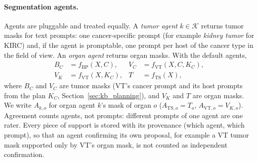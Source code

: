 \documentclass[fleqn,10pt]{olplainarticle}
\begin{document}
\paragraph{Segmentation agents.}
Agents are pluggable and treated equally. A \emph{tumor agent} $k\in\mathcal{K}$ returns tumor masks for text prompts:
one cancer-specific prompt (for example \emph{kidney tumor} for KIRC) and, if the agent is promptable, one prompt per host
of the cancer type in the field of view. An \emph{organ agent} returns organ masks. With the default agents,
\begin{equation}
\label{eq:agents}
\begin{aligned}
B_C&=f_{\mathrm{BP}}(X,C), & V_C&=f_{\mathrm{VT}}(X,C,K_C),\\
V_K&=f_{\mathrm{VT}}(X,K_C), & T&=f_{\mathrm{TS}}(X),
\end{aligned}
\end{equation}
where $B_C$ and $V_C$ are tumor masks (VT's cancer prompt and its host prompts from the plan $K_C$,
Section~\ref{sec:kb_planning}), and $V_K$ and $T$ are organ masks. We write $A_{k,o}$ for organ agent $k$'s mask of
organ $o$ ($A_{\mathrm{TS},o}=T_o$, $A_{\mathrm{VT},o}=V_{K,o}$). Agreement counts agents, not prompts: different
prompts of one agent are one rater. Every piece of support is stored with its provenance (which agent, which prompt), so
that an agent confirming its own proposal, for example a VT tumor mask supported only by VT's organ mask, is not counted
as independent confirmation.
\end{document}
